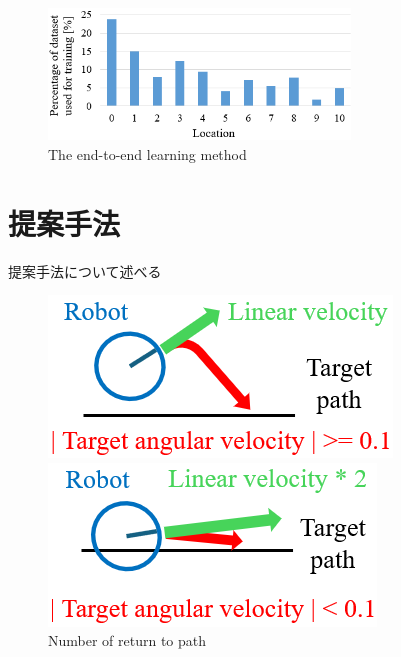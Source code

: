 \documentclass{jarticle}
\begin{document}
\begin{figure}[h!]
  \centering
   \includegraphics[height=35mm]{./png/gaku2.png}
   \caption{The end-to-end learning method}
\end{figure}




\section{提案手法}
提案手法について述べる

\begin{figure}[htbp]
  \begin{minipage}[t]{0.5\linewidth}
    \centering
    \includegraphics[keepaspectratio, scale=0.31]{./png/a.png}
  \end{minipage}
  \begin{minipage}[t]{0.5\linewidth}
    \centering
    \includegraphics[keepaspectratio, scale=0.31]{./png/b.png}
  \end{minipage}
  \caption{Number of return to path}
\end{figure}

\end{document}
